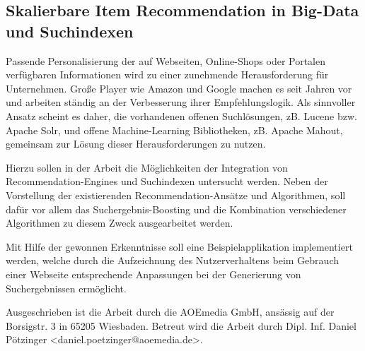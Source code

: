 \documentclass[a4paper, german, 12pt, onecolumn, oneside,bibliography=totoc,listof=totoc]{article}
\begin{document}
\pagestyle{empty}
\renewcommand{\baselinestretch}{1.5}\normalsize

\subsection*{Skalierbare Item Recommendation in Big-Data und Suchindexen}

Passende Personalisierung der auf Webseiten, Online-Shops oder Portalen verfügbaren Informationen wird zu einer zunehmende Herausforderung für Unternehmen.
Große Player wie Amazon und Google machen es seit Jahren vor und arbeiten ständig an der Verbesserung ihrer Empfehlungslogik. Als sinnvoller Ansatz scheint es daher, die vorhandenen offenen Suchlösungen, zB. Lucene bzw. Apache Solr, und offene Machine-Learning Bibliotheken, zB. Apache Mahout, gemeinsam zur Lösung dieser Herausforderungen zu nutzen.

Hierzu sollen in der Arbeit die Möglichkeiten der Integration von Recommendation-Engines und Suchindexen untersucht werden. Neben der Vorstellung der existierenden Recommendation-Ansätze und Algorithmen, soll dafür vor allem das Suchergebnis-Boosting und die Kombination verschiedener Algorithmen zu diesem Zweck ausgearbeitet werden.

Mit Hilfe der gewonnen Erkenntnisse soll eine Beispielapplikation implementiert werden, welche durch die Aufzeichnung des Nutzerverhaltens beim Gebrauch einer Webseite entsprechende Anpassungen bei der Generierung von Suchergebnissen ermöglicht.

Ausgeschrieben ist die Arbeit durch die AOEmedia GmbH, ansässig auf der Borsigstr. 3 in 65205 Wiesbaden. Betreut wird die Arbeit  durch Dipl. Inf. Daniel Pötzinger <daniel.poetzinger@aoemedia.de>.
\end{document}
